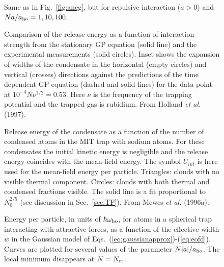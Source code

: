 \bigskip

\begin{figure}[t]
\epsfysize=8cm
\hspace{3cm}
\caption{Same as in Fig.~\protect\ref{fig:aneg}, but 
for repulsive interaction ($a>0$) and $Na/a_{\rm ho}= 1, 10, 100$.   } 
\label{fig:apos}
\end{figure}

\bigskip

\begin{figure}[t]
\epsfysize=8cm
\hspace{3cm}
\caption{Comparison of the release energy as a function of
interaction strength from the stationary GP equation (solid line) 
and  the experimental measurements (solid circles). Inset shows the
expansion  of widths of the condensate  in the horizontal (empty 
circles) and vertical (crosses) directions against the predictions
of the time dependent GP equation (dashed and solid lines) for the 
data point at $10^{-4} N \nu^{1/2} = 0.53$. Here $\nu$ is the 
frequency of the trapping potential and the trapped gas is 
rubidium. From Holland {\it et al.} (1997).  } 
\label{fig:releasejila}
\end{figure}

\bigskip

\begin{figure}[t]
\epsfysize=8cm
\hspace{3cm}
\caption{Release energy of the condensate as a function of the number 
of condensed atoms in the MIT trap with sodium atoms. For these 
condensates the initial kinetic energy is negligible and the release
energy coincides with the mean-field energy. The symbol $U_{int}$
is here used for the mean-field energy per particle.
Triangles: clouds with no visible thermal component. Circles: clouds
with both thermal and condensed fractions visible. The solid line is 
a fit proportional to $N_0^{2/5}$ (see discussion in 
Sec.~\protect\ref{sec:TF}). From Mewes {\it et al.} (1996a).  } 
\label{fig:releasemit}
\end{figure}

\bigskip

\begin{figure}[t]
\epsfysize=8cm
\hspace{3cm}
\caption{Energy per particle, in units of $\hbar \omega_{\rm ho}$, for
atoms in a spherical trap interacting with attractive forces, as
a function of the effective width $w$ in the Gaussian model of 
Eqs.~(\protect\ref{eq:gaussianapprox})-(\protect\ref{eq:eofd}). 
Curves are plotted for several values of the parameter 
$N|a|/a_{\rm ho}$. The local minimum disappears at $N=N_{\rm cr}$.} 
\label{fig:gauss}
\end{figure}

